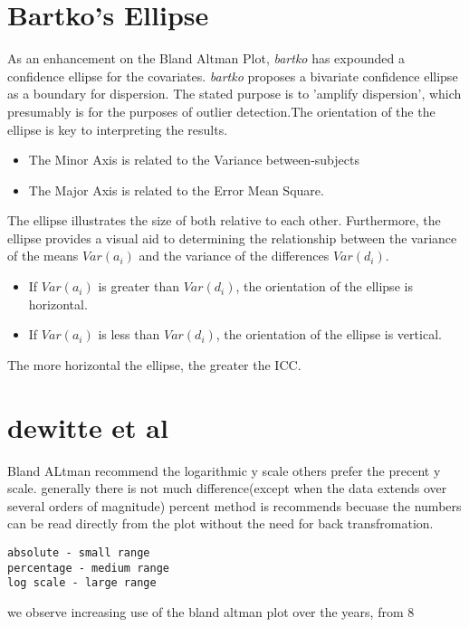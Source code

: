 \documentclass[Chap2bmain.tex]{subfiles}
\begin{document}
\section{Bartko's Ellipse}
As an enhancement on the Bland Altman Plot, \textit{bartko} has
expounded a confidence ellipse for the covariates. \textit{bartko} proposes
a bivariate confidence ellipse as a boundary for dispersion. The stated purpose is to 'amplify dispersion', which presumably is for  the purposes of outlier detection.The orientation of the the ellipse is key to interpreting the results.
\begin{itemize}
 \item The Minor Axis is related to the Variance between-subjects
 \item The Major Axis is related to the Error Mean Square.
\end{itemize}
The ellipse illustrates the size of both relative to each
other. Furthermore, the ellipse provides a visual aid to determining the relationship
between the variance of the means $Var(a_{i})$ and the variance of the differences $Var(d_{i})$.
\begin{itemize}
 \item If $Var(a_{i})$ is greater than $Var(d_{i})$, the orientation of the ellipse is horizontal.
 \item If $Var(a_{i})$ is less than $Var(d_{i})$, the orientation of the ellipse is vertical.
\end{itemize}
The more horizontal the ellipse, the greater the ICC.

\newpage



\section{dewitte et al }
Bland ALtman recommend the logarithmic y scale
others prefer the  precent y scale.
generally there is not much difference(except when the data extends over several orders of magnitude)
percent method is recommends becuase the numbers can be read directly from the plot without the need for back transfromation.

\begin{verbatim}
absolute - small range
percentage - medium range
log scale - large range
\end{verbatim}
we observe increasing use of the bland altman plot over the years, from 8%
\end{document}
